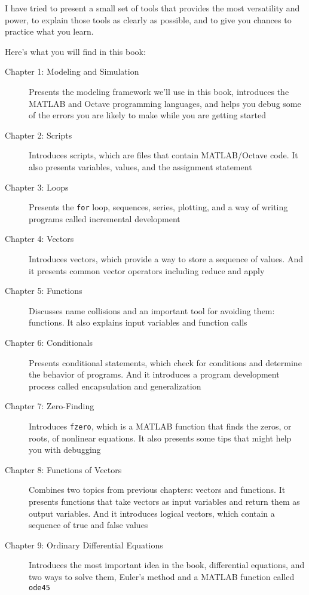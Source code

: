 I have tried to present a small set of tools that provides the most versatility and power, to explain those tools as clearly as possible, and to give you chances to practice what you learn.

Here's what you will find in this book:
\begin{description}
\item [Chapter 1: Modeling and Simulation] Presents the modeling framework we'll use in this book, introduces the MATLAB and Octave programming languages, and helps you debug some of the errors you are likely to make while you are getting started

\item [Chapter 2: Scripts] Introduces scripts, which are files that contain MATLAB/Octave code.  It also presents variables, values, and the assignment statement

\item [Chapter 3: Loops] Presents the \lstinline{for} loop, sequences, series, plotting, and a way of writing programs called incremental development

\item [Chapter 4: Vectors] Introduces vectors, which provide a way to store a sequence of values.  And it presents common vector operators including reduce and apply

\item [Chapter 5: Functions] Discusses name collisions and an important tool for avoiding them: functions.  It also explains input variables and function calls

\item [Chapter 6: Conditionals] Presents conditional statements, which check for conditions and determine the behavior of programs.  And it introduces a program development process called encapsulation and generalization

\item [Chapter 7: Zero-Finding] Introduces \lstinline{fzero}, which is a MATLAB function that finds the zeros, or roots, of nonlinear equations.  It also presents some tips that might help you with debugging

\item [Chapter 8: Functions of Vectors] Combines two topics from previous chapters: vectors and functions.  It presents functions that take vectors as input variables and return them as output variables.  And it \mbox{introduces} logical vectors, which contain a sequence of true and false values

\item [Chapter 9: Ordinary Differential Equations] Introduces the most important idea in the book, differential equations, and two ways to solve them, Euler's method and a MATLAB function called \lstinline{ode45}


\end{description}
